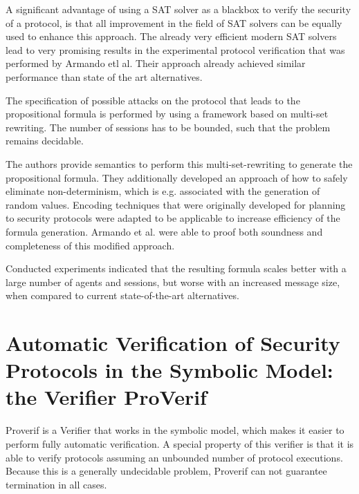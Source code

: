 \documentclass[a4paper,UKenglish]{lipics-v2018}
\begin{document}
A significant advantage of using a SAT solver as a blackbox to verify the security of a protocol, is that all improvement in the field of SAT solvers can be equally used to enhance this approach. The already very efficient modern SAT solvers lead to very promising results in the experimental protocol verification that was performed by Armando etl al. Their approach already achieved similar performance than state of the art alternatives.\cite{sat}

The specification of possible attacks on the protocol that leads to the propositional formula is performed by using a framework based on multi-set rewriting. The number of sessions has to be bounded, such that the problem remains decidable.\cite{sat}


The authors provide semantics to perform this multi-set-rewriting to generate the propositional formula. They additionally developed an approach of how to safely eliminate non-determinism, which is e.g. associated with the generation of random values.
Encoding techniques that were originally developed for planning to security protocols were adapted to be applicable to increase efficiency of the formula generation. Armando et al. were able to proof both soundness and completeness of this modified approach.\cite{sat}

Conducted experiments indicated that the resulting formula scales better with a large number of agents and sessions, but worse with an increased message size, when compared to current state-of-the-art alternatives.\cite{sat}





\newpage
\section{Automatic Verification of Security Protocols in the Symbolic Model: the Verifier ProVerif}

Proverif is a Verifier that works in the symbolic model, which makes it easier to perform fully automatic verification. A special property of this verifier is that it is able to verify protocols assuming an unbounded number of protocol executions. Because this is a generally undecidable problem, Proverif can not guarantee termination in all cases.\cite{ProVerif}
\end{document}
